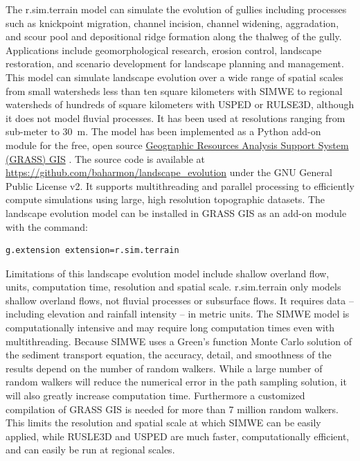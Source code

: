 \documentclass[gmd, manuscript]{copernicus}
\begin{document}
The r.sim.terrain model
can simulate the evolution of gullies
including processes such as 
knickpoint migration,
channel incision, 
channel widening, 
aggradation, and
scour pool and 
depositional ridge formation
along the thalweg of the gully. 
Applications include 
geomorphological research,
erosion control, 
landscape restoration, 
and scenario development 
for landscape planning and management.
This model can simulate landscape evolution 
over a wide range of spatial scales 
from small watersheds 
less than ten square kilometers
with SIMWE
to regional watersheds
of hundreds of square kilometers
with USPED or RULSE3D,
although it does not model fluvial processes. 
It has been used at resolutions ranging from sub-meter to 30~\unit{m}.
The model has been implemented 
as a Python add-on module 
for the free, open source
\href{https://grass.osgeo.org/}{Geographic Resources Analysis Support System (GRASS) GIS}
\citep{GRASS}. 
The source code is available at 
\url{https://github.com/baharmon/landscape\_evolution} 
under the GNU General Public License v2.
It supports multithreading and parallel processing
to efficiently compute simulations 
using large, high resolution topographic datasets.
%
The landscape evolution model 
can be installed in GRASS GIS as an add-on module 
with the command: 
\begin{verbatim}
g.extension extension=r.sim.terrain
\end{verbatim}

Limitations of this landscape evolution model include
shallow overland flow, 
units, computation time, resolution and spatial scale.
r.sim.terrain only models shallow overland flows, 
not fluvial processes or subsurface flows. 
It requires data -- including 
elevation and rainfall intensity -- in metric units. 
The SIMWE model is computationally intensive 
and may require long computation times even with multithreading.
Because SIMWE uses a Green's function Monte Carlo solution 
of the sediment transport equation, 
the accuracy, detail, and smoothness of the results 
depend on the number of random walkers.
While a large number of random walkers will reduce the
numerical error in the path sampling solution,
it will also greatly increase computation time.
Furthermore a customized compilation of GRASS GIS 
is needed for more than 7 million random walkers.
This limits the resolution and spatial scale 
at which SIMWE can be easily applied,
while RUSLE3D and USPED are much faster, computationally efficient,
and can easily be run at regional scales. 
\end{document}

